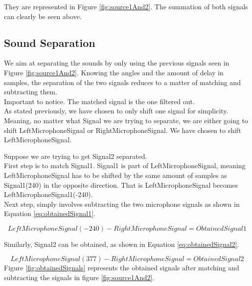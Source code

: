 They are represented in Figure \ref{fig:source1And2}. The summation of both signals 
can clearly be seen above.
\newpage
\subsection*{Sound Separation}
We aim at separating the sounds by only using the previous signals seen in Figure 
\ref{fig:source1And2}. Knowing the angles and the amount of delay in samples, the 
separation of the two signals reduces to a matter of matching and subtracting them. 
\\
Important to notice. The matched signal is the one filtered out.\\

As stated previously, we have chosen to only shift one signal for simplicity. 
Meaning, no matter what Signal we are trying to separate, we are either going to 
shift LeftMicrophoneSignal or RightMicrophoneSignal. We have chosen to shift 
LeftMicrophoneSignal.

Suppose we are trying to get Signal2 separated.\\
First step is to match Signal1. Signal1 is part of LeftMicrophoneSignal, meaning 
LeftMicrophoneSignal has to be shifted by the same amount of samples as 
Signal1(240) in the opposite direction. That is LeftMicrophoneSignal becomes 
LeftMicrophoneSignal1(-240).\\

Next step, simply involves subtracting the two microphone signals as shown in 
Equation \ref{eq:obtainedSignal1}.

\begin{equation}
	LeftMicrophoneSignal(-240) - RightMicrophoneSignal = ObtainedSignal1
	\label{eq:obtainedSignal1}
\end{equation}

Similarly, Signal2 can be obtained, as shown in Equation \ref{eq:obtainedSignal2}.

\begin{equation}
	LeftMicrophoneSignal(377) - RightMicrophoneSignal = ObtainedSignal2
	\label{eq:obtainedSignal2}
\end{equation}
\newpage
Figure \ref{fig:obtainedSignals} represents the obtained signals after matching and 
subtracting the signals in figure \ref{fig:source1And2}.

